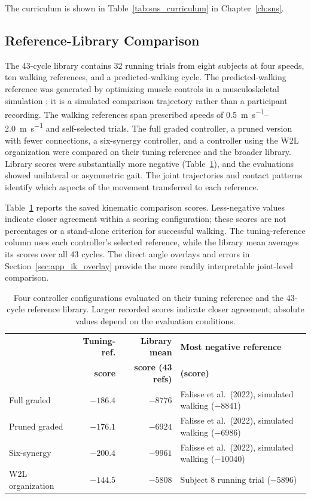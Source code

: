 The curriculum is shown in Table~\ref{tab:sns_curriculum} in Chapter~\ref{ch:sns}.

\subsection{Reference-Library Comparison}\label{sec:gait_library_results}

The 43-cycle library contains 32 running trials from eight subjects at four speeds, ten walking references, and a predicted-walking cycle. The predicted-walking reference was generated by optimizing muscle controls in a musculoskeletal simulation \citep{falisse_modeling_2022}; it is a simulated comparison trajectory rather than a participant recording. The walking references span prescribed speeds of \qtyrange{0.5}{2.0}{\meter\per\second} and self-selected trials. The full graded controller, a pruned version with fewer connections, a six-synergy controller, and a controller using the W2L organization were compared on their tuning reference and the broader library. Library scores were substantially more negative (Table~\ref{tab:gait_sweep}), and the evaluations showed unilateral or asymmetric gait. The joint trajectories and contact patterns identify which aspects of the movement transferred to each reference.

Table~\ref{tab:gait_sweep} reports the saved kinematic comparison scores. Less-negative values indicate closer agreement within a scoring configuration; these scores are not percentages or a stand-alone criterion for successful walking. The tuning-reference column uses each controller's selected reference, while the library mean averages its scores over all 43 cycles. The direct angle overlays and errors in Section~\ref{sec:app_ik_overlay} provide the more readily interpretable joint-level comparison.

\begin{table}[htbp]
\caption{Four controller configurations evaluated on their tuning reference and the 43-cycle reference library. Larger recorded scores indicate closer agreement; absolute values depend on the evaluation conditions.}
\label{tab:gait_sweep}
\begin{tabularx}{\textwidth}{@{}lrr>{\raggedright\arraybackslash}X@{}}
\toprule
 & \textbf{Tuning-ref.} & \textbf{Library mean} & \textbf{Most negative reference} \\
 & \textbf{score} & \textbf{score (43 refs)} & \textbf{(score)} \\
\midrule
Full graded        & $-186.4$ & $-8776$ & Falisse et al.\ (2022), simulated walking ($-8841$) \\
Pruned graded  & $-176.1$ & $-6924$ & Falisse et al.\ (2022), simulated walking ($-6986$) \\
Six-synergy       & $-200.4$ & $-9961$ & Falisse et al.\ (2022), simulated walking ($-10040$) \\
W2L organization     & $-144.5$ & $-5808$ & Subject 8 running trial ($-5896$) \\
\bottomrule
\end{tabularx}
\end{table}


